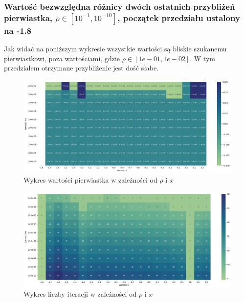\documentclass{article}
\begin{document}
\subsubsection{Wartość bezwzględna różnicy dwóch ostatnich przybliżeń pierwiastka, \(\rho \in [10^{-1}, 10^{-10}]\), początek przedziału ustalony na -1.8}

Jak widać na poniższym wykresie wszystkie wartości są bliskie szukanemu pierwiastkowi, poza wartościami, gdzie \(\rho \in [1e-01, 1e-02]\). W tym przedzialem otrzymane przybliżenie jest dość słabe.

\begin{figure}[H]
  \centering
  \begin{minipage}[b]{0.9\textwidth}
    \includegraphics[width=\textwidth]{heatmap17.png}
  \end{minipage}
  \caption{Wykres wartości pierwiastka w zależności od \(\rho\) i \(x\)}
\end{figure}

\begin{figure}[H]
  \centering
  \begin{minipage}[b]{0.9\textwidth}
    \includegraphics[width=\textwidth]{heatmap18.png}
  \end{minipage}
  \caption{Wykres liczby iteracji w zależności od \(\rho\) i \(x\)}
\end{figure}
\end{document}
